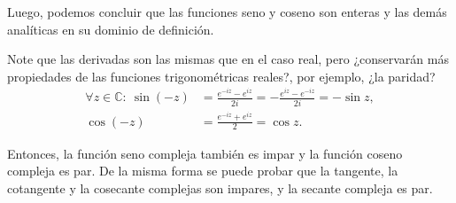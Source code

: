 Luego, podemos concluir que las funciones seno y coseno son enteras y las demás analíticas en su dominio de definición.

Note que las derivadas son las mismas que en el caso real, pero ¿conservarán más propiedades de las funciones trigonométricas reales?, por ejemplo, ¿la paridad?
\begin{align*}
\forall z \in \mathbb{C}:~ \sin(-z) &= \frac{e^{-iz} - e^{iz}}{2i} = - \frac{ e^{iz} - e^{-iz} }{2i} = - \sin z , \\
\cos(-z) &= \frac{e^{-iz} + e^{iz}}{2} =  \cos z.
\end{align*}

Entonces, la función seno compleja también es impar y la función coseno compleja es par. De la misma forma se puede probar que la tangente, la cotangente y la cosecante complejas son impares, y la secante compleja es par.

